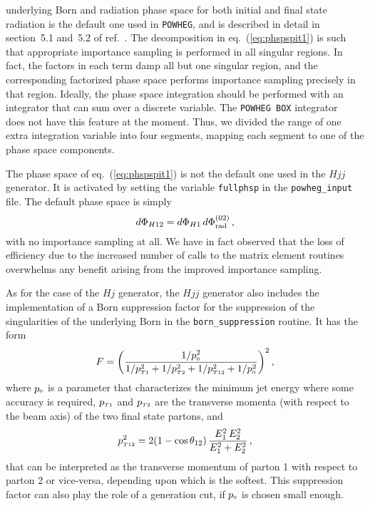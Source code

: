\documentclass[paper]{JHEP3}
\newcommand\Phirad{\Phi_{\rm rad}}
\def\({\left(}
\def\){\right)}
\newcommand\sss{\mathchoice%
{\displaystyle}%
{\scriptstyle}%
{\scriptscriptstyle}%
{\scriptscriptstyle}%
}
\newcommand\pzero{p_{\sss\rm 0}}
\newcommand\POWHEG{{\tt POWHEG}}
\newcommand\POWHEGBOX{{\tt POWHEG BOX}}
\begin{document}
underlying Born and radiation phase space for both initial and final
state radiation is the default one used in
\POWHEG{}, and is described in detail in section~5.1 and~5.2 of
ref.~\cite{Frixione:2007vw}. The decomposition in eq.~(\ref{eq:phspspit1})
is such that appropriate importance sampling is performed in all singular
regions. In fact, the factors in each term damp all but one singular region,
and the corresponding factorized phase space performs importance sampling
precisely in that region. Ideally, the phase space integration should be performed 
with an integrator that can sum over a discrete variable. The \POWHEGBOX{}
integrator~\cite{Nason:2007vt} does not have this feature at the moment.
Thus, we divided the range of one extra integration variable into four segments,
mapping each segment to one of the phase space components.

The phase space of eq.~(\ref{eq:phspspit1}) is not the default one
used in the $Hjj$ generator. It is activated by setting the variable
{\tt fullphsp} in the {\tt powheg\_input} file. The default phase
space is simply
\begin{equation}
d\Phi_{H12}=d\Phi_{H1} \, d\Phirad^{(02)}\,,
\end{equation}
with no importance sampling at all.  We have in fact observed that the loss
of efficiency due to the increased number of calls to the matrix element
routines overwhelms any benefit arising from the improved importance
sampling.

As for the case of the $Hj$ generator, the $Hjj$ generator also includes
the implementation of a Born suppression factor for the suppression of the
singularities of the underlying Born in the
{\tt born\_suppression} routine. It has the form
\begin{equation}
F=\( \frac{1/\pzero^2}{1/p_{\sss T1}^2+1/p_{\sss T2}^2+1/p_{\sss T12}^2+ 1/\pzero^2}\)^2,
\end{equation}
where $\pzero$ is a parameter that characterizes the minimum jet energy where
some accuracy is required, $p_{\sss T1}$ and $p_{\sss T2}$ are the transverse momenta
(with respect to the beam axis) of the two final state partons, and
\begin{equation}
p_{\sss T12}^2=2 (1-\cos\theta_{12}) \,\frac{E_1^2\,E_2^2}{E_1^2+E_2^2}\,,
\end{equation}
that can be interpreted as the transverse momentum of parton 1 with respect
to parton 2 or vice-versa, depending upon which is the softest.  This
suppression factor can also play the role of a generation cut, if $\pzero$ is
chosen small enough.
\end{document}
